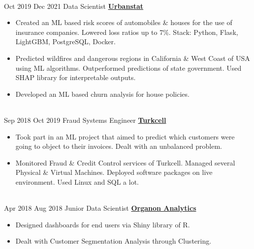 \documentclass[letterpaper]{DS_class_file} %
\begin{document}
\begin{twenty}
{\begin{itemize}
					
			\end{itemize}}
			\\
		\twentyitem
			{Oct 2019}
			{Dec 2021}
			{\hspace{0.3cm}Data Scientist}
			{\href{https://www.urbanstat.com/}{\textbf{Urbanstat}}}
			{}
			{\begin{itemize}
				\item Created an ML based risk scores of automobiles \& houses for the use of insurance companies. Lowered loss ratios up to 7\%. \newline Stack: Python, Flask, LightGBM, PostgreSQL, Docker.
				\item Predicted wildfires and dangerous regions in California \& West Coast of USA using ML algorithms. Outperformed predictions of state government. Used SHAP library for interpretable outputs.
				\item Developed an ML based churn analysis for house policies.
			\end{itemize}}
			\\
		\twentyitem
			{Sep 2018}
			{Oct 2019}
			{\hspace{0.3cm}Fraud Systems Engineer}
			{\href{https://www.turkcell.com.tr/}{\textbf{Turkcell}}}
			{}
			{\begin{itemize}
				\item Took part in an ML project that aimed to predict which customers were going to object to their invoices. Dealt with an unbalanced problem.
				\item Monitored Fraud \& Credit Control services of Turkcell. Managed several Physical \& Virtual Machines. Deployed software packages on live environment. Used Linux and SQL a lot.
			\end{itemize}}
			\\
		\twentyitem
			{Apr 2018}
			{Aug 2018}
			{\hspace{0.3cm}Junior Data Scientist}
			{\href{http://www.organonanalytics.com/pages/index.php}{\textbf{Organon Analytics}}}
			{}
			{\begin{itemize}
				\item Designed dashboards for end users via Shiny library of R.
				\item Dealt with Customer Segmentation Analysis through Clustering.
			\end{itemize}}
			\\
	\end{twenty}
	
\end{document}
